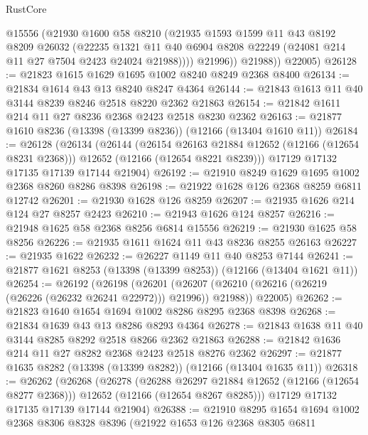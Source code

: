 \begin{lexlean}{RustCore}
\begin{coremodule}
              @15556
              (@21930
                @1600
                @58
                @8210
                (@21935
                  @1593
                  @1599
                  @11
                  @43
                  @8192
                  @8209
                  @26032
                  (@22235
                    @1321
                    @11
                    @40
                    @6904
                    @8208
                    @22249
                    (@24081 @214 @11 @27 @7504 @2423 @24024 @21988))))
              @21996))
          @21988))
      @22005)
@26128 := @21823 @1615 @1629 @1695 @1002 @8240 @8249 @2368 @8400
@26134 := @21834 @1614 @43 @13 @8240 @8247 @4364
@26144 := @21843 @1613 @11 @40 @3144 @8239 @8246 @2518 @8220 @2362 @21863
@26154 := @21842 @1611 @214 @11 @27 @8236 @2368 @2423 @2518 @8230 @2362
@26163 := @21877 @1610 @8236 (@13398 (@13399 @8236)) (@12166 (@13404 @1610 @11))
@26184 := @26128
    (@26134
      (@26144
        (@26154 @26163 @21884 @12652 (@12166 (@12654 @8231 @2368)))
        @12652
        (@12166 (@12654 @8221 @8239)))
      @17129
      @17132
      @17135
      @17139
      @17144
      @21904)
@26192 := @21910 @8249 @1629 @1695 @1002 @2368 @8260 @8286 @8398
@26198 := @21922 @1628 @126 @2368 @8259 @6811 @12742
@26201 := @21930 @1628 @126 @8259
@26207 := @21935 @1626 @214 @124 @27 @8257 @2423
@26210 := @21943 @1626 @124 @8257
@26216 := @21948 @1625 @58 @2368 @8256 @6814 @15556
@26219 := @21930 @1625 @58 @8256
@26226 := @21935 @1611 @1624 @11 @43 @8236 @8255 @26163
@26227 := @21935 @1622
@26232 := @26227 @1149 @11 @40 @8253 @7144
@26241 := @21877 @1621 @8253 (@13398 (@13399 @8253)) (@12166 (@13404 @1621 @11))
@26254 := @26192
    (@26198
      (@26201 (@26207 (@26210 (@26216 (@26219 (@26226 (@26232 @26241 @22972))) @21996)) @21988))
      @22005)
@26262 := @21823 @1640 @1654 @1694 @1002 @8286 @8295 @2368 @8398
@26268 := @21834 @1639 @43 @13 @8286 @8293 @4364
@26278 := @21843 @1638 @11 @40 @3144 @8285 @8292 @2518 @8266 @2362 @21863
@26288 := @21842 @1636 @214 @11 @27 @8282 @2368 @2423 @2518 @8276 @2362
@26297 := @21877 @1635 @8282 (@13398 (@13399 @8282)) (@12166 (@13404 @1635 @11))
@26318 := @26262
    (@26268
      (@26278
        (@26288 @26297 @21884 @12652 (@12166 (@12654 @8277 @2368)))
        @12652
        (@12166 (@12654 @8267 @8285)))
      @17129
      @17132
      @17135
      @17139
      @17144
      @21904)
@26388 := @21910
    @8295
    @1654
    @1694
    @1002
    @2368
    @8306
    @8328
    @8396
    (@21922
      @1653
      @126
      @2368
      @8305
      @6811

\end{coremodule}
\end{lexlean}
